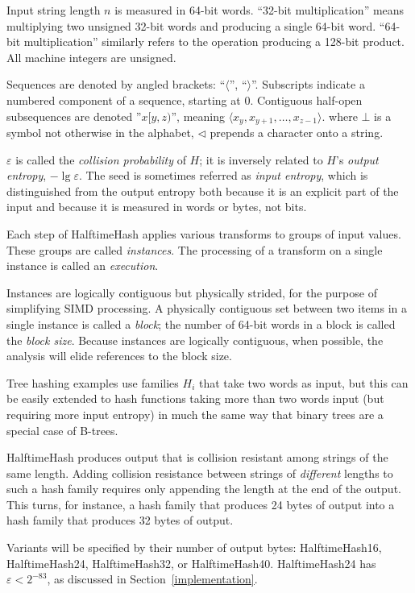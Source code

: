 \documentclass[runningheads]{llncs}
\begin{document}
Input string length $n$ is measured in 64-bit words.
``32-bit multiplication'' means multiplying two unsigned 32-bit words and producing a single 64-bit word.
``64-bit multiplication'' similarly refers to the operation producing a 128-bit product.
All machine integers are unsigned.

Sequences are denoted by angled brackets: ``$\langle$'', ``$\rangle$''.
Subscripts indicate a numbered component of a sequence, starting at 0.
Contiguous half-open subsequences are denoted ''$x[y,z)$'', meaning $\langle x_y, x_{y+1}, \dots, x_{z-1} \rangle$.
where $\bot$ is a symbol not otherwise in the alphabet, $\triangleleft$ prepends a character onto a string.

$\varepsilon$ is called the {\em collision probability} of $H$; it is inversely related to $H$'s {\em output entropy}, $-\lg \varepsilon$.
The seed is sometimes referred as {\em input entropy}, which is distinguished from the output entropy both because it is an explicit part of the input and because it is measured in words or bytes, not bits.

Each step of HalftimeHash applies various transforms to groups of input values.
These groups are called {\em instances}.
The processing of a transform on a single instance is called an {\em execution}.

Instances are logically contiguous but physically strided, for the purpose of simplifying SIMD processing.
A physically contiguous set between two items in a single instance is called a {\em block}; the number of 64-bit words in a block is called the {\em block size}.
Because instances are logically contiguous, when possible, the analysis will elide references to the block size.

Tree hashing examples use families $H_i$ that take two words as input, but this can be easily extended to hash functions taking more than two words input (but requiring more input entropy) in much the same way that binary trees are a special case of B-trees.

HalftimeHash produces output that is collision resistant among strings of the same length.
Adding collision resistance between strings of {\em different} lengths to such a hash family requires only appending the length at the end of the output.
This turns, for instance, a hash family that produces 24 bytes of output into a hash family that produces 32 bytes of output.

Variants will be specified by their number of output bytes: HalftimeHash16, HalftimeHash24, HalftimeHash32, or HalftimeHash40.
HalftimeHash24 has $\varepsilon < 2^{-83}$, as discussed in Section~\ref{implementation}.
\end{document}

